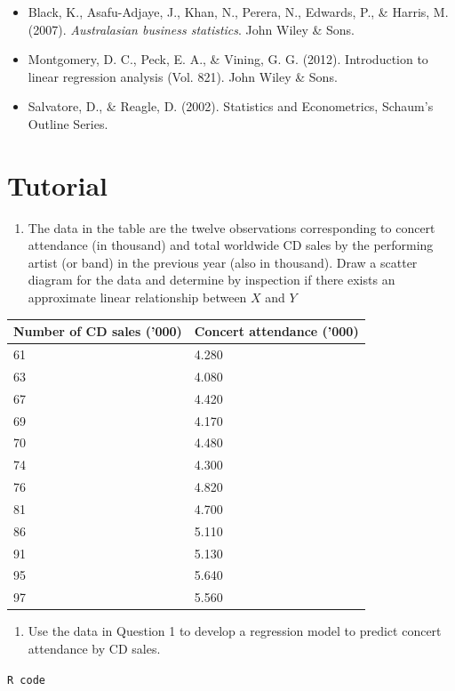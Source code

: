 \documentclass[]{book}
\providecommand{\tightlist}{%
  \setlength{\itemsep}{0pt}\setlength{\parskip}{0pt}}
\begin{document}
\begin{itemize}
\item
  Black, K., Asafu-Adjaye, J., Khan, N., Perera, N., Edwards, P., \& Harris, M. (2007). \emph{Australasian business statistics}. John Wiley \& Sons.
\item
  Montgomery, D. C., Peck, E. A., \& Vining, G. G. (2012). Introduction to linear regression analysis (Vol. 821). John Wiley \& Sons.
\item
  Salvatore, D., \& Reagle, D. (2002). Statistics and Econometrics, Schaum's Outline Series.
\end{itemize}

\newpage

\hypertarget{tutorial-7}{%
\section*{Tutorial}\label{tutorial-7}}

\begin{enumerate}
\def\labelenumi{\arabic{enumi}.}
\tightlist
\item
  The data in the table are the twelve observations corresponding to concert attendance (in thousand) and total worldwide CD sales by the performing artist (or band) in the previous year (also in thousand). Draw a scatter diagram for the data and determine by inspection if there exists an approximate linear relationship between \(X\) and \(Y\)
\end{enumerate}

\begin{longtable}[]{@{}ll@{}}
\toprule
Number of CD sales ('000) & Concert attendance ('000)\tabularnewline
\midrule
\endhead
61 & 4.280\tabularnewline
63 & 4.080\tabularnewline
67 & 4.420\tabularnewline
69 & 4.170\tabularnewline
70 & 4.480\tabularnewline
74 & 4.300\tabularnewline
76 & 4.820\tabularnewline
81 & 4.700\tabularnewline
86 & 5.110\tabularnewline
91 & 5.130\tabularnewline
95 & 5.640\tabularnewline
97 & 5.560\tabularnewline
\bottomrule
\end{longtable}

\begin{enumerate}
\def\labelenumi{\arabic{enumi}.}
\setcounter{enumi}{1}
\tightlist
\item
  Use the data in Question 1 to develop a regression model to predict concert attendance by CD sales.
\end{enumerate}

\texttt{R\ code}
\end{document}
